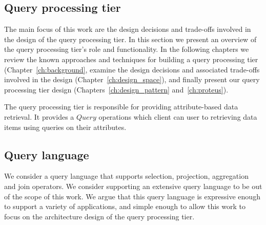 \subsection{Query processing tier}
\label{subsec:query_prcessing_tier}
Τhe main focus of this work are the design decisions and trade-offs involved in the design of the query processing tier.
In this section we present an overview of the query processing tier's role and functionality.
In the following chapters we review the known approaches and techniques for building a query processing tier (Chapter~\ref{ch:background},
examine the design decisions and associated trade-offs involved in the design (Chapter~\ref{ch:design_space}),
and finally present our query processing tier design (Chapters~\ref{ch:design_pattern} and~\ref{ch:proteus}).

\medskip
\noindent
The query processing tier is responsible for providing attribute-based data retrieval.
It provides a $Query$ operations which client can user to retrieving data items using queries on their attributes.


\subsection{Query language}

We consider a query language that supports selection, projection, aggregation and join operators.
We consider supporting an extensive query language to be out of the scope of this work.
We argue that this query language is expressive enough to support a variety of applications,
and simple enough to allow this work to focus on the architecture design of the query processing tier.

